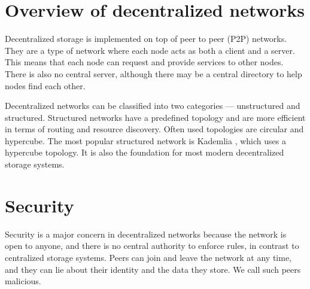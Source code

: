 \section{Overview of decentralized networks}

Decentralized storage is implemented on top of peer to peer (P2P) networks.
They are a type of network where each node acts as both a client and a server.
This means that each node can request and provide services to other nodes.
There is also no central server, although there may be a central directory to help nodes find each other.

Decentralized networks can be classified into two categories --- unstructured and structured.
Structured networks have a predefined topology and are more efficient in terms of routing and resource discovery.
Often used topologies are circular and hypercube.
The most popular structured network is Kademlia \cite{kademlia}, which uses a hypercube topology.
It is also the foundation for most modern decentralized storage systems.




\section{Security}

Security is a major concern in decentralized networks because
the network is open to anyone, and there is no central authority to enforce rules,
in contrast to centralized storage systems.
Peers can join and leave the network at any time, and they can lie about their identity and the data they store.
We call such peers malicious.

